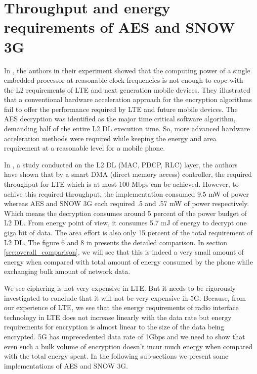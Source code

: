 \documentclass[lnicst,sechang,a4paper]{svmultln}
\begin{document}
\section{Throughput and energy requirements of AES and SNOW 3G}
\label{sec:throughput_and_energy_requirements_of_aes_snow3g}
In \cite{IIS_Ruhr_2009}, the authors in their experiment showed that the computing power of a single embedded processor at reasonable clock frequencies is not enough to cope with the L2 requirements of LTE and next generation mobile devices. They illustrated that a conventional hardware acceleration approach for the encryption algorithms fail to offer the performance required by LTE and future mobile devices. The AES decryption was identified as the major time critical software algorithm, demanding half of the entire L2 DL execution time. So, more advanced hardware acceleration methods were required while keeping the energy and area requirement at a reasonable level for a mobile phone.

In \cite{IIS_Ruhr_2010}, a study conducted on the L2 DL (MAC, PDCP, RLC) layer, the authors have shown that by a smart DMA (direct memory access) controller, the required throughput for LTE which is at most 100 Mbps can be achieved. However, to achive this required throughput, the implementation consumed 9.5 mW of power whereas AES and SNOW 3G each required .5 and .57 mW of power respectively. Which means the decryption consumes around 5 percent of the power budget of L2 DL. From energy point of view, it consumes 5.7 mJ of energy to decrypt one giga bit of data. The area effort is also only 15 percent of the total requirement of L2 DL. The figure 6 and 8 in \cite{IIS_Ruhr_2010} presents the detailed comparison. In section \ref{sec:overall_comparison}, we will see that this is indeed a very small amount of energy when compared with total amount of energy consumed by the phone while exchanging bulk amount of network data.

We see ciphering is not very expensive in LTE. But it needs to be rigorously investigated to conclude that it will not be very expensive in 5G. Because, from our experience of LTE, we see that the energy requirements of radio interface technology in LTE does not increase linearly with the data rate but energy requirements for encryption is almost linear to the size of the data being encrypted. 5G has unprecedented data rate of 1Gbps and we need to show that even such a bulk volume of encryption doesn't incur much energy when compared with the total energy spent. In the following sub-sections we present some implementations of AES and SNOW 3G.
\end{document}
